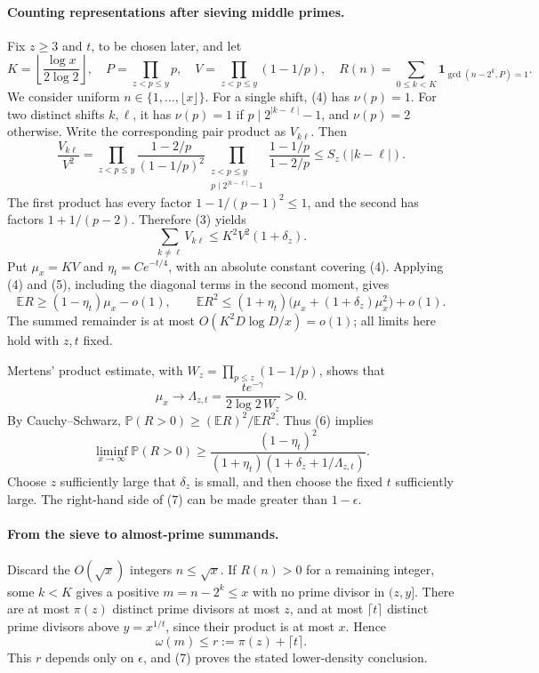 \paragraph{Counting representations after sieving middle primes.}
Fix \(z\geq3\) and \(t\), to be chosen later, and let
\[
 K=\left\lfloor\frac{\log x}{2\log2}\right\rfloor,
 \quad P=\prod_{z<p\leq y}p,
 \quad V=\prod_{z<p\leq y}(1-1/p),
 \quad R(n)=\sum_{0\leq k<K}\mathbf1_{\gcd(n-2^k,P)=1}.
\]
We consider uniform \(n\in\{1,\ldots,\lfloor x\rfloor\}\). For a single shift, (4) has \(\nu(p)=1\). For two distinct shifts \(k,\ell\), it has \(\nu(p)=1\) if \(p\mid2^{|k-\ell|}-1\), and \(\nu(p)=2\) otherwise. Write the corresponding pair product as \(V_{k\ell}\). Then
\[
 \frac{V_{k\ell}}{V^2}
 =\prod_{z<p\leq y}\frac{1-2/p}{(1-1/p)^2}
 \prod_{\substack{z<p\leq y\\p\mid2^{|k-\ell|}-1}}
 \frac{1-1/p}{1-2/p}
 \leq S_z(|k-\ell|).
\]
The first product has every factor \(1-1/(p-1)^2\leq1\), and the second has factors \(1+1/(p-2)\). Therefore (3) yields
\[
 \sum_{k\ne\ell}V_{k\ell}\leq K^2V^2(1+\delta_z). \tag{5}
\]
Put \(\mu_x=KV\) and \(\eta_t=C e^{-t/4}\), with an absolute constant covering (4). Applying (4) and (5), including the diagonal terms in the second moment, gives
\[
 \mathbb ER\geq(1-\eta_t)\mu_x-o(1),\qquad
 \mathbb ER^2\leq(1+\eta_t)
 \bigl(\mu_x+(1+\delta_z)\mu_x^2\bigr)+o(1). \tag{6}
\]
The summed remainder is at most \(O(K^2D\log D/x)=o(1)\); all limits here hold with \(z,t\) fixed.

Mertens' product estimate, with \(W_z=\prod_{p\leq z}(1-1/p)\), shows that
\[
 \mu_x\longrightarrow
 \Lambda_{z,t}=\frac{t e^{-\gamma}}{2\log2\,W_z}>0.
\]
By Cauchy--Schwarz, \(\mathbb P(R>0)\geq(\mathbb ER)^2/\mathbb ER^2\). Thus (6) implies
\[
 \liminf_{x\to\infty}\mathbb P(R>0)
 \geq \frac{(1-\eta_t)^2}
 {(1+\eta_t)(1+\delta_z+1/\Lambda_{z,t})}. \tag{7}
\]
Choose \(z\) sufficiently large that \(\delta_z\) is small, and then choose the fixed \(t\) sufficiently large. The right-hand side of (7) can be made greater than \(1-\epsilon\).

\paragraph{From the sieve to almost-prime summands.}
Discard the \(O(\sqrt x)\) integers \(n\leq\sqrt x\). If \(R(n)>0\) for a remaining integer, some \(k<K\) gives a positive \(m=n-2^k\leq x\) with no prime divisor in \((z,y]\). There are at most \(\pi(z)\) distinct prime divisors at most \(z\), and at most \(\lceil t\rceil\) distinct prime divisors above \(y=x^{1/t}\), since their product is at most \(x\). Hence
\[
 \omega(m)\leq r:=\pi(z)+\lceil t\rceil.
\]
This \(r\) depends only on \(\epsilon\), and (7) proves the stated lower-density conclusion.

